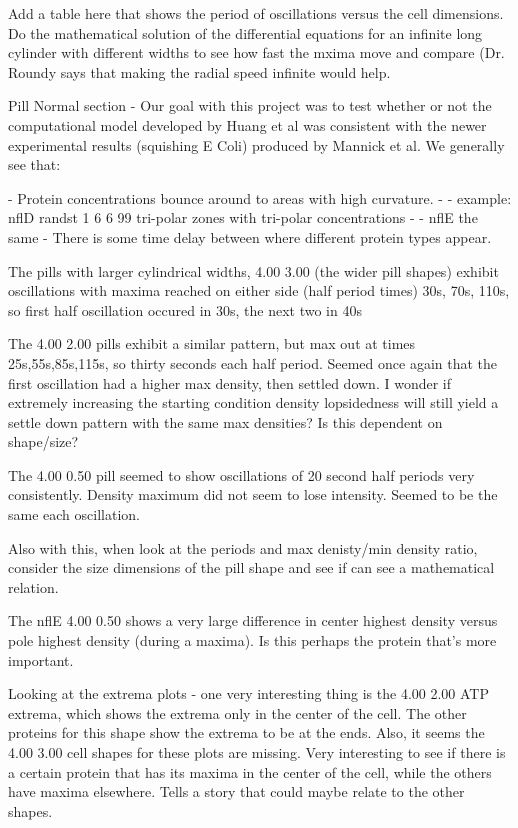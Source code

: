 \documentclass[letterpaper,twocolumn,amsmath,amssymb,pre]{revtex4-1}
\begin{document}
Add a table here that shows the period of oscillations versus the cell
dimensions.  Do the mathematical solution of the differential
equations for an infinite long cylinder with different widths to see
how fast the mxima move and compare (Dr. Roundy says that making the
radial speed infinite would help.


Pill Normal section -
Our goal with this project was to test whether or not the computational
model developed by Huang et al was consistent with the newer experimental
results (squishing E Coli) produced by Mannick et al. We generally see
that:

- Protein concentrations bounce around to areas with high curvature.
- - example: nflD randst 1 6 6 99 tri-polar zones with tri-polar concentrations
- - nflE the same
- There is some time delay between where different protein types appear.



The pills with larger cylindrical widths, 4.00 3.00 (the wider pill shapes)
exhibit oscillations with maxima reached on either side (half period
times) 30s, 70s, 110s, so first half oscillation occured in 30s, the
next two in 40s

The 4.00 2.00 pills exhibit a similar pattern, but max out at times
25s,55s,85s,115s, so thirty seconds each half period.  Seemed once again that
the first oscillation had a higher max density, then settled down.  I
wonder if extremely increasing the starting condition density
lopsidedness will still yield a settle down pattern with the same max
densities?  Is this dependent on shape/size?

The 4.00 0.50 pill seemed to show oscillations of 20 second half
periods very consistently.  Density maximum did not seem to lose
intensity.  Seemed to be the same each oscillation.

 Also with this, when look at the periods and max
denisty/min density ratio, consider the size dimensions of the pill
shape and see if can see a mathematical relation.

The nflE 4.00 0.50 shows a very large difference in center highest density
versus pole highest density (during a maxima).  Is this perhaps the
protein that's more important.

Looking at the extrema plots - one very interesting thing is the 4.00
2.00 ATP extrema, which shows the extrema only in the center of the
cell.  The other proteins for this shape show the extrema to be at the
ends.  Also, it seems the 4.00 3.00 cell shapes for these plots are
missing.  Very interesting to see if there is a certain protein that
has its maxima in the center of the cell, while the others have maxima
elsewhere.  Tells a story that could maybe relate to the other shapes.
\end{document}
